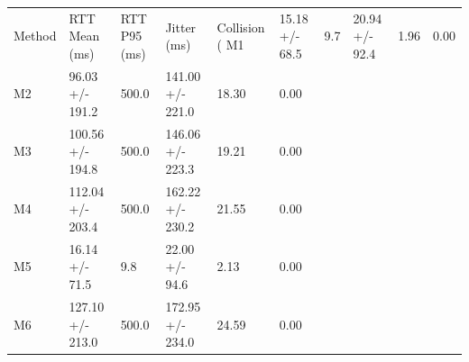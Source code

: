 \begin{tabular}{llllll}
\toprule
Method & RTT Mean (ms) & RTT P95 (ms) & Jitter (ms) & Collision (%
\midrule
M1 & 15.18 +/- 68.5 & 9.7 & 20.94 +/- 92.4 & 1.96 & 0.00 \\
M2 & 96.03 +/- 191.2 & 500.0 & 141.00 +/- 221.0 & 18.30 & 0.00 \\
M3 & 100.56 +/- 194.8 & 500.0 & 146.06 +/- 223.3 & 19.21 & 0.00 \\
M4 & 112.04 +/- 203.4 & 500.0 & 162.22 +/- 230.2 & 21.55 & 0.00 \\
M5 & 16.14 +/- 71.5 & 9.8 & 22.00 +/- 94.6 & 2.13 & 0.00 \\
M6 & 127.10 +/- 213.0 & 500.0 & 172.95 +/- 234.0 & 24.59 & 0.00 \\
\bottomrule
\end{tabular}
